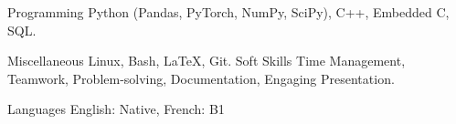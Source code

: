 

\begin{cvskills}

  \cvskill
    {Programming} %
    {Python (Pandas, PyTorch, NumPy, SciPy), C++, Embedded C, SQL.} %

  \cvskill
    {Miscellaneous} %
    {Linux, Bash, \LaTeX, Git.} %
  \cvskill
    {Soft Skills} %
    {Time Management, Teamwork, Problem-solving, Documentation, Engaging Presentation.} %
  
  \cvskill
    {Languages} %
    {English: Native, French: B1} %

\end{cvskills}

